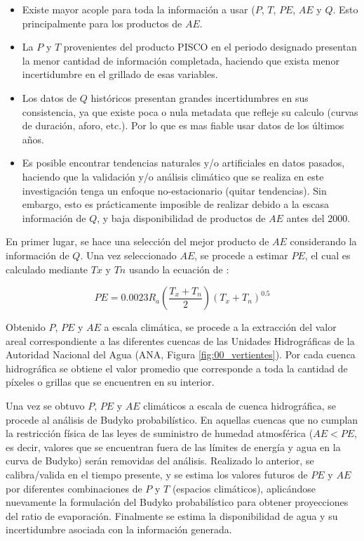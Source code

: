 \documentclass[12pt]{article}
\begin{document}
\begin{itemize}

	\item Existe mayor acople para toda la información a usar ($P$, $T$, $PE$, $AE$ y $Q$. Esto principalmente para los productos de $AE$.
	
	\item La $P$ y $T$ provenientes del producto PISCO en el periodo designado presentan la menor cantidad de información completada, haciendo que exista menor incertidumbre en el grillado de esas variables.
	
	\item Los datos de $Q$ históricos presentan grandes incertidumbres en sus consistencia, ya que existe poca o nula metadata que refleje su calculo (curvas de duración, aforo, etc.). Por lo que es mas fiable usar datos de los últimos años.
	
	\item Es posible encontrar tendencias naturales y/o artificiales en datos pasados, haciendo que la validación y/o análisis climático que se realiza en este investigación tenga un enfoque no-estacionario (quitar tendencias). Sin embargo, esto es prácticamente imposible de realizar debido a la escasa información de $Q$, y baja disponibilidad de productos de $AE$ antes del 2000.
	
\end{itemize}

En primer lugar, se hace una selección del mejor producto de $AE$ considerando la información de $Q$. Una vez seleccionado $AE$, se procede a estimar $PE$, el cual es calculado mediante $Tx$ y $Tn$ usando la ecuación de \citet{Hargreaves1985}:

\begin{equation}
PE = 0.0023R_{a}\left ( \frac{T_{x}+T_{n}}{2} \right )\left ( T_{x}+T_{n} \right )^{0.5}
\end{equation}

Obtenido $P$, $PE$ y $AE$ a escala climática, se procede a la extracción del valor areal correspondiente a las diferentes cuencas de las Unidades Hidrográficas de la Autoridad Nacional del Agua (ANA, Figura \ref{fig:00_vertientes}). Por cada cuenca hidrográfica se obtiene el valor promedio que corresponde a toda la cantidad de píxeles o grillas que se encuentren en su interior.

Una vez se obtuvo $P$, $PE$ y $AE$ climáticos a escala de cuenca hidrográfica, se procede al análisis de Budyko probabilístico. En aquellas cuencas que no cumplan la restricción física de las leyes de suministro de humedad atmosférica ($AE < PE$, es decir, valores que se encuentran fuera de las límites de energía y agua en la curva de Budyko) serán removidas del análisis. Realizado lo anterior, se calibra/valida en el tiempo presente, y se estima los valores futuros de $PE$ y $AE$ por diferentes combinaciones de $P$ y $T$ (espacios climáticos), aplicándose nuevamente la formulación del Budyko probabilístico para obtener proyecciones del ratio de evaporación. Finalmente se estima la disponibilidad de agua y su incertidumbre asociada con la información generada.
\end{document}
